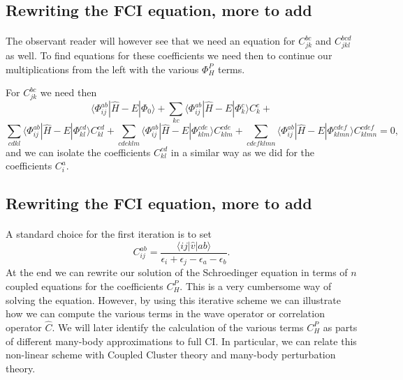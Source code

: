 \subsection*{Rewriting the FCI equation, more to add}

\paragraph{}
The observant reader will however see that we need an equation for $C_{jk}^{bc}$ and $C_{jkl}^{bcd}$ as well.
To find equations for these coefficients we need then to continue our multiplications from the left with the various
$\Phi_{H}^P$ terms. 

For $C_{jk}^{bc}$ we need then
\[
\langle \Phi_{ij}^{ab} | \hat{H} -E| \Phi_0\rangle + \sum_{kc}\langle \Phi_{ij}^{ab} | \hat{H} -E|\Phi_{k}^{c} \rangle C_{k}^{c}+
\]
\[
\sum_{cdkl}\langle \Phi_{ij}^{ab} | \hat{H} -E|\Phi_{kl}^{cd} \rangle C_{kl}^{cd}+\sum_{cdeklm}\langle \Phi_{ij}^{ab} | \hat{H} -E|\Phi_{klm}^{cde} \rangle C_{klm}^{cde}+\sum_{cdefklmn}\langle \Phi_{ij}^{ab} | \hat{H} -E|\Phi_{klmn}^{cdef} \rangle C_{klmn}^{cdef}=0,
\]
and we can isolate the coefficients $C_{kl}^{cd}$ in a similar way as we did for the coefficients $C_{i}^{a}$.



\subsection*{Rewriting the FCI equation, more to add}

\paragraph{}
A standard choice for the first iteration is to set 
\[
C_{ij}^{ab} =\frac{\langle ij \vert \hat{v} \vert ab \rangle}{\epsilon_i+\epsilon_j-\epsilon_a-\epsilon_b}.
\]
At the end we can rewrite our solution of the Schroedinger equation in terms of $n$ coupled equations for the coefficients $C_H^P$.
This is a very cumbersome way of solving the equation. However, by using this iterative scheme we can illustrate how we can compute the
various terms in the wave operator or correlation operator $\hat{C}$. We will later identify the calculation of the various terms $C_H^P$
as parts of different many-body approximations to full CI. In particular, we can  relate this non-linear scheme with Coupled Cluster theory and
many-body perturbation theory.



